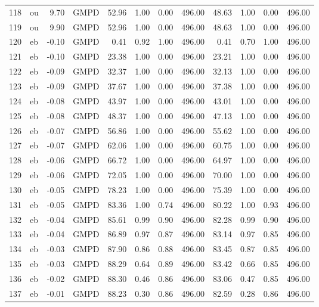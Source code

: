 \begin{table}[ht]
\begin{tabular}{rlrlrrrrrrrr}
  118 & ou & 9.70 & GMPD & 52.96 & 1.00 & 0.00 & 496.00 & 48.63 & 1.00 & 0.00 & 496.00 \\ 
  119 & ou & 9.90 & GMPD & 52.96 & 1.00 & 0.00 & 496.00 & 48.63 & 1.00 & 0.00 & 496.00 \\ 
  120 & eb & -0.10 & GMPD & 0.41 & 0.92 & 1.00 & 496.00 & 0.41 & 0.70 & 1.00 & 496.00 \\ 
  121 & eb & -0.10 & GMPD & 23.38 & 1.00 & 0.00 & 496.00 & 23.21 & 1.00 & 0.00 & 496.00 \\ 
  122 & eb & -0.09 & GMPD & 32.37 & 1.00 & 0.00 & 496.00 & 32.13 & 1.00 & 0.00 & 496.00 \\ 
  123 & eb & -0.09 & GMPD & 37.67 & 1.00 & 0.00 & 496.00 & 37.38 & 1.00 & 0.00 & 496.00 \\ 
  124 & eb & -0.08 & GMPD & 43.97 & 1.00 & 0.00 & 496.00 & 43.01 & 1.00 & 0.00 & 496.00 \\ 
  125 & eb & -0.08 & GMPD & 48.37 & 1.00 & 0.00 & 496.00 & 47.13 & 1.00 & 0.00 & 496.00 \\ 
  126 & eb & -0.07 & GMPD & 56.86 & 1.00 & 0.00 & 496.00 & 55.62 & 1.00 & 0.00 & 496.00 \\ 
  127 & eb & -0.07 & GMPD & 62.06 & 1.00 & 0.00 & 496.00 & 60.75 & 1.00 & 0.00 & 496.00 \\ 
  128 & eb & -0.06 & GMPD & 66.72 & 1.00 & 0.00 & 496.00 & 64.97 & 1.00 & 0.00 & 496.00 \\ 
  129 & eb & -0.06 & GMPD & 72.05 & 1.00 & 0.00 & 496.00 & 70.00 & 1.00 & 0.00 & 496.00 \\ 
  130 & eb & -0.05 & GMPD & 78.23 & 1.00 & 0.00 & 496.00 & 75.39 & 1.00 & 0.00 & 496.00 \\ 
  131 & eb & -0.05 & GMPD & 83.36 & 1.00 & 0.74 & 496.00 & 80.22 & 1.00 & 0.93 & 496.00 \\ 
  132 & eb & -0.04 & GMPD & 85.61 & 0.99 & 0.90 & 496.00 & 82.28 & 0.99 & 0.90 & 496.00 \\ 
  133 & eb & -0.04 & GMPD & 86.89 & 0.97 & 0.87 & 496.00 & 83.14 & 0.97 & 0.85 & 496.00 \\ 
  134 & eb & -0.03 & GMPD & 87.90 & 0.86 & 0.88 & 496.00 & 83.45 & 0.87 & 0.85 & 496.00 \\ 
  135 & eb & -0.03 & GMPD & 88.29 & 0.64 & 0.89 & 496.00 & 83.42 & 0.66 & 0.85 & 496.00 \\ 
  136 & eb & -0.02 & GMPD & 88.30 & 0.46 & 0.86 & 496.00 & 83.06 & 0.47 & 0.85 & 496.00 \\ 
  137 & eb & -0.01 & GMPD & 88.23 & 0.30 & 0.86 & 496.00 & 82.59 & 0.28 & 0.86 & 496.00 \\ 

\end{tabular}
\end{table}
